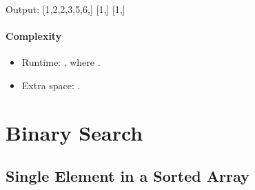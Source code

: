 \documentclass[letterpaper,12pt,english]{book}
\begin{document}
\begin{sphinxVerbatim}[commandchars=\\\{\}]
\end{sphinxVerbatim}

\begin{sphinxVerbatim}[commandchars=\\\{\}]
Output:
[1,2,2,3,5,6,]
[1,]
[1,]
\end{sphinxVerbatim}


\subsubsection{Complexity}
\label{\detokenize{Sorting/04_SORT_88_Merge_Sorted_Array:id2}}\begin{itemize}
\item {} 
\sphinxAtStartPar
Runtime: , where .

\item {} 
\sphinxAtStartPar
Extra space: .

\end{itemize}

\sphinxstepscope


\chapter{Binary Search}
\label{\detokenize{Binary_Search/index:binary-search}}\label{\detokenize{Binary_Search/index::doc}}
\sphinxstepscope


\section{Single Element in a Sorted Array}
\label{\detokenize{Binary_Search/540_Single_Element_in_a_Sorted_Array:single-element-in-a-sorted-array}}\label{\detokenize{Binary_Search/540_Single_Element_in_a_Sorted_Array::doc}}
\end{document}

